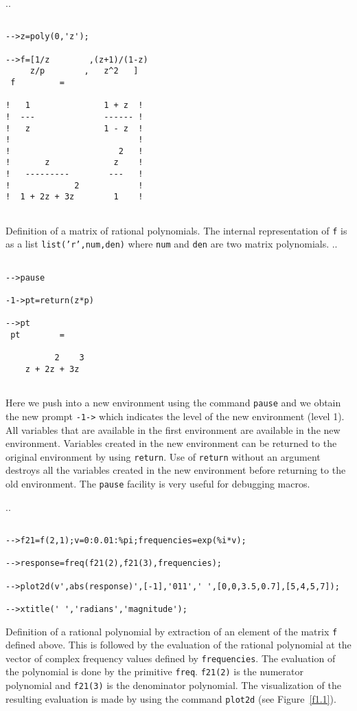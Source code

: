 \noindent.\dotfill.
\begin{verbatim}
 
-->z=poly(0,'z');
 
-->f=[1/z        ,(z+1)/(1-z)
     z/p        ,   z^2   ]
 f         =
 
!   1               1 + z  !
!  ---              ------ !
!   z               1 - z  !
!                          !
!                      2   !
!       z             z    !
!   ---------        ---   !
!             2            !
!  1 + 2z + 3z        1    !
 
\end{verbatim}
Definition of a matrix of rational polynomials.  The internal representation
of {\tt f} is as a list {\tt list('r',num,den)} where {\tt num} and 
{\tt den} are two matrix polynomials.  
\noindent.\dotfill.
\begin{verbatim}
 
-->pause
 
-1->pt=return(z*p)
 
-->pt
 pt        =
 
          2    3  
    z + 2z + 3z   
 
\end{verbatim}
Here we push into a new environment using the command 
{\tt pause}
and we obtain the new prompt {\tt -1->} which indicates the level
of the new environment (level 1).  All variables that are available
in the first environment are available in the new environment.  Variables
created in the new environment can be returned to the original environment
by using {\tt return}.  
Use of {\tt return} without an argument 
destroys all the variables created in the new environment before returning
to the old environment. The {\tt pause} facility is very useful 
for debugging macros.

\noindent.\dotfill.
\begin{verbatim}
 
-->f21=f(2,1);v=0:0.01:%pi;frequencies=exp(%i*v);
 
-->response=freq(f21(2),f21(3),frequencies);
 
-->plot2d(v',abs(response)',[-1],'011',' ',[0,0,3.5,0.7],[5,4,5,7]);
 
-->xtitle(' ','radians','magnitude');
\end{verbatim}

Definition of a rational polynomial by extraction of an element
of the matrix {\tt f} defined above.  This is followed by the evaluation
of the rational polynomial at the vector of complex frequency values defined
by {\tt frequencies}.  The evaluation of the polynomial is done by
the primitive {\tt freq}. {\tt f21(2)} is the numerator
polynomial and {\tt f21(3)} is the denominator polynomial.
The  visualization of the resulting evaluation
is made by using the command {\tt plot2d} (see Figure~\ref{f1.1}).

